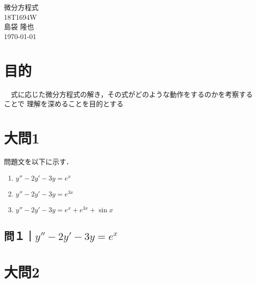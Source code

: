 \documentclass[a4paper,11pt]{bxjsarticle}
\begin{document}
\begin{titlepage}
  \begin{center}
    \vspace*{150truept}
    {\Huge 微分方程式}\\ %
    \vspace{120truept}
    {\huge 18T1694W}\\ %
    \vspace{50truept}
    {\huge 島袋 隆也}\\ %
    \vspace{50truept}
    {\huge \today}\\ %
  \end{center}
\end{titlepage}


\section{目的}
　式に応じた微分方程式の解き，その式がどのような動作をするのかを考察することで
理解を深めることを目的とする


\section{大問1}
問題文を以下に示す．
\begin{enumerate}
  \item $y''-2y'-3y=e^x$
  \item $y''-2y'-3y=e^{3x}$
  \item $y''-2y'-3y=e^x+e^{3x}+\sin x$
\end{enumerate}

\subsection{問１｜$y''-2y'-3y=e^x$}


\section{大問2}
\subsection{}




 
\end{document}
